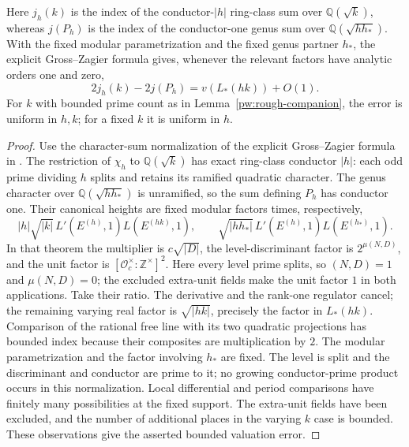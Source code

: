 \begin{lemma}\label{pw:height-comparison}
Here $j_h(k)$ is the index of the conductor-$|h|$ ring-class sum over
$\mathbb Q(\sqrt{k})$, whereas $j(P_h)$ is the index of the conductor-one
genus sum over $\mathbb Q(\sqrt{hh_*})$.
With the fixed modular parametrization and the fixed genus partner $h_*$,
the explicit Gross--Zagier formula gives, whenever the relevant factors
have analytic orders one and zero,
\begin{equation}\label{pw:height-ratio}
 2j_h(k)-2j(P_h)=v(L_*(hk))+O(1).
\end{equation}
For $k$ with bounded prime count as in
Lemma~\ref{pw:rough-companion}, the error is uniform in $h,k$; for a fixed
$k$ it is uniform in $h$.
\end{lemma}

\begin{proof}
Use the character-sum normalization of the explicit Gross--Zagier formula
in \cite[Theorem~1.1]{CaiShuTian2014}.  The restriction of $\chi_h$ to
$\mathbb Q(\sqrt{k})$ has exact ring-class conductor $|h|$: each odd
prime dividing $h$ splits and retains its ramified quadratic character.
The genus character over $\mathbb Q(\sqrt{hh_*})$ is unramified, so the
sum defining $P_h$ has conductor one.  Their canonical
heights are fixed modular factors times, respectively,
\[
 |h|\sqrt{|k|}\,L'(E^{(h)},1)L(E^{(hk)},1),
 \qquad
 \sqrt{|hh_*|}\,L'(E^{(h)},1)L(E^{(h_*)},1).
\]
In that theorem the multiplier is $c\sqrt{|D|}$, the level-discriminant
factor is $2^{\mu(N,D)}$, and the unit factor is
$[\mathcal O_c^\times:\mathbb Z^\times]^2$.  Here every level prime
splits, so $(N,D)=1$ and $\mu(N,D)=0$; the excluded extra-unit fields
make the unit factor $1$ in both applications.
Take their ratio.  The derivative and the rank-one regulator cancel;
the remaining varying real factor is $\sqrt{|hk|}$, precisely the factor
in $L_*(hk)$.  Comparison of the rational free line with its two quadratic
projections has bounded index because their composites are multiplication
by $2$.  The modular parametrization and the factor involving $h_*$ are
fixed.  The level is split and the discriminant and conductor are prime
to it; no growing conductor-prime product occurs in this normalization.
Local differential and period comparisons have finitely many possibilities
at the fixed support.  The extra-unit fields have been excluded, and the
number of additional places in the varying $k$ case is bounded.  These
observations give the asserted bounded valuation error.
\end{proof}

